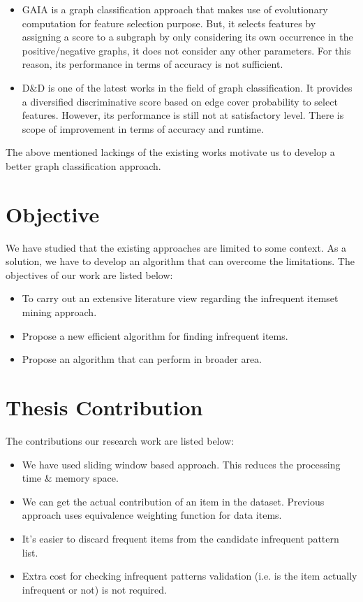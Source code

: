 \begin{itemize}
\item GAIA \cite{gaia} is a graph classification approach that makes use of evolutionary computation for feature selection purpose. But, it selects features by assigning  a score to a subgraph by only considering its own occurrence in the positive/negative graphs, it does not consider any other parameters. For this reason, its performance in terms of accuracy is not sufficient.
%
\item D\&D \cite{dnd} is one of the latest works in the field of graph classification. It provides a diversified discriminative score based on edge cover probability to select features. However, its performance is still not at satisfactory level. There is scope of improvement in terms of accuracy and runtime.
\end{itemize}
%
The above mentioned lackings of the existing works motivate us to develop a better graph classification approach.
%
\fi
\section{Objective}
%
We have studied that the existing approaches are limited to some context. As a solution, we have to develop an algorithm that can overcome the limitations. The objectives of our work are listed below:
%
\begin{itemize}
\item To carry out an extensive literature view regarding the infrequent itemset mining approach.
\item Propose a new efficient algorithm for finding infrequent items. 
\item Propose an algorithm that can perform in broader area.
\end{itemize}
%
\section{Thesis Contribution}
%
The contributions our research work are listed below:
%
\begin{itemize}
%
\item We have used sliding window based approach. This reduces the processing time \& memory space.
%
\item We can get the actual contribution of an item in the dataset. Previous approach uses equivalence weighting function for data items.
% 
\item It’s easier to discard frequent items from the candidate infrequent pattern list.
\item Extra cost for checking infrequent patterns validation (i.e. is the item actually infrequent or not) is not required.
%
\end{itemize}
%
